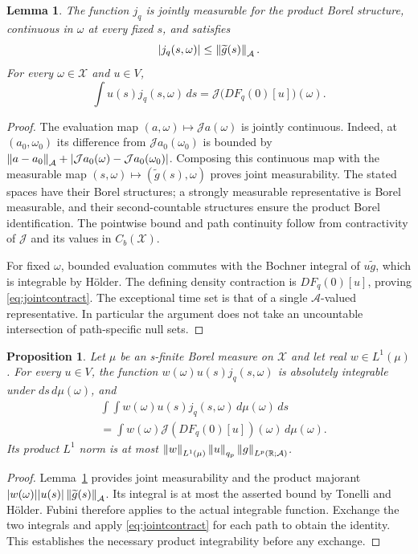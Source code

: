 \documentclass[11pt]{article}
\newtheorem{lemma}[theorem]{Lemma}
\newtheorem{proposition}[theorem]{Proposition}
\theoremstyle{remark}\newtheorem{remark}[theorem]{Remark}
\newcommand{\R}{\mathbb R}\newcommand{\C}{\mathbb C}
\newcommand{\A}{\mathcal A}\newcommand{\X}{\mathcal X}
\begin{document}
\begin{lemma}\label{lem:joint}
The function $j_q$ is jointly measurable for the product Borel
structure, continuous in $\omega$ at every fixed $s$, and satisfies
\[
 |j_q(s,\omega)|\le\norm{\widetilde g(s)}_{\A}.
\]
For every $\omega\in\X$ and $u\in V$,
\begin{equation}\label{eq:jointcontract}
 \int u(s)j_q(s,\omega)\,ds
 =\mathcal J\big(DF_q(0)[u]\big)(\omega).
\end{equation}
\end{lemma}
\begin{proof}
The evaluation map $(a,\omega)\mapsto\mathcal Ja(\omega)$ is jointly
continuous. Indeed, at $(a_0,\omega_0)$ its difference from
$\mathcal Ja_0(\omega_0)$ is bounded by
$\norm{a-a_0}_{\A}+|\mathcal Ja_0(\omega)-\mathcal Ja_0(\omega_0)|$.
Composing this continuous map with the measurable map
$(s,\omega)\mapsto(\widetilde g(s),\omega)$ proves joint
measurability. The stated spaces have their Borel structures; a
strongly measurable representative is Borel measurable, and their
second-countable structures ensure the product Borel identification.
The pointwise bound and path continuity follow from contractivity of
$\mathcal J$ and its values in $C_b(\X)$.

For fixed $\omega$, bounded evaluation commutes with the Bochner
integral of $u\widetilde g$, which is integrable by H\"older.
The defining density contraction is $DF_q(0)[u]$, proving
\eqref{eq:jointcontract}. The exceptional time set is that of a single
$\A$-valued representative. In particular the argument does not take
an uncountable intersection of path-specific null sets.
\end{proof}

\begin{proposition}\label{prop:fubini}
Let $\mu$ be an s-finite Borel measure on $\X$ and let real $w\in
L^1(\mu)$. For every $u\in V$, the function
$w(\omega)u(s)j_q(s,\omega)$ is absolutely integrable under
$ds\,d\mu(\omega)$, and
\begin{align*}
 &\int\!\int w(\omega)u(s)j_q(s,\omega)\,d\mu(\omega)\,ds\\
 &=\int w(\omega)\mathcal J(DF_q(0)[u])(\omega)\,d\mu(\omega).
\end{align*}
Its product $L^1$ norm is at most
$\norm w_{L^1(\mu)}\norm u_{q_p}\norm g_{L^p(\R;\A)}$.
\end{proposition}
\begin{proof}
Lemma~\ref{lem:joint} provides joint measurability and the product
majorant
$|w(\omega)||u(s)|\norm{\widetilde g(s)}_{\A}$.
Its integral is at most the asserted bound by Tonelli and H\"older.
Fubini therefore applies to the actual integrable function.
Exchange the two integrals and apply \eqref{eq:jointcontract} for each
path to obtain the identity. This establishes the necessary product
integrability before any exchange.
\end{proof}
\end{document}

